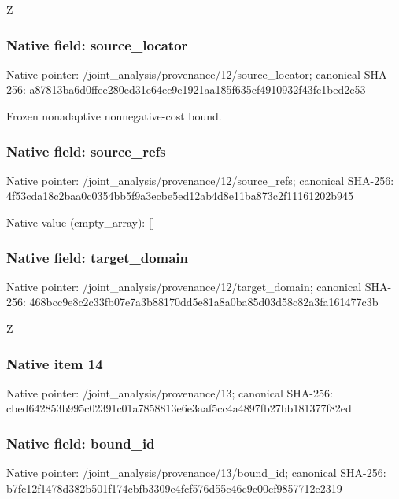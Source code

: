 \documentclass[10pt,a4paper]{article}
\begin{document}
\begingroup\raggedright\sloppy Z\par\endgroup

\subsubsection{Native field: source\_\allowbreak{}locator}
Native pointer: /joint\_\allowbreak{}analysis/provenance/12/source\_\allowbreak{}locator; canonical SHA-256: a87813ba6d0ffee280ed31e64ec9e1921aa185f635cf4910932f43fc1bed2c53

\begingroup\raggedright\sloppy Frozen nonadaptive nonnegative-cost bound.\par\endgroup

\subsubsection{Native field: source\_\allowbreak{}refs}
Native pointer: /joint\_\allowbreak{}analysis/provenance/12/source\_\allowbreak{}refs; canonical SHA-256: 4f53cda18c2baa0c0354bb5f9a3ecbe5ed12ab4d8e11ba873c2f11161202b945

Native value (empty\_\allowbreak{}array): []

\subsubsection{Native field: target\_\allowbreak{}domain}
Native pointer: /joint\_\allowbreak{}analysis/provenance/12/target\_\allowbreak{}domain; canonical SHA-256: 468bcc9e8c2c33fb07e7a3b88170dd5e81a8a0ba85d03d58c82a3fa161477c3b

\begingroup\raggedright\sloppy Z\par\endgroup

\subsubsection{Native item 14}
Native pointer: /joint\_\allowbreak{}analysis/provenance/13; canonical SHA-256: cbed642853b995c02391c01a7858813e6e3aaf5cc4a4897fb27bb181377f82ed

\subsubsection{Native field: bound\_\allowbreak{}id}
Native pointer: /joint\_\allowbreak{}analysis/provenance/13/bound\_\allowbreak{}id; canonical SHA-256: b7fc12f1478d382b501f174cbfb3309e4fcf576d55c46c9c00cf9857712e2319
\end{document}
